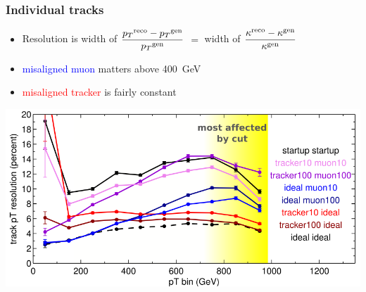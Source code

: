 \documentclass[compress]{beamer}
\begin{document}
\begin{frame}
\frametitle{Individual tracks}
\begin{itemize}
\item Resolution is width of $\displaystyle \frac{{p_T}^{\mbox{\scriptsize reco}} - {p_T}^{\mbox{\scriptsize gen}}}{{p_T}^{\mbox{\scriptsize gen}}}$ $=$ width of $\displaystyle \frac{{\kappa}^{\mbox{\scriptsize reco}} - {\kappa}^{\mbox{\scriptsize gen}}}{{\kappa}^{\mbox{\scriptsize gen}}}$
\item \textcolor{blue}{misaligned muon} matters above 400~GeV
\item \textcolor{red}{misaligned tracker} is fairly constant
\end{itemize}
\includegraphics[width=\linewidth]{bypt_widths.png}
\end{frame}
\end{document}
